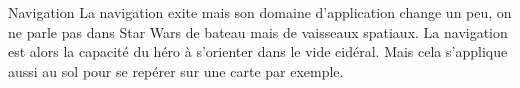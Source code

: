 \begin{paperbox}{Navigation}
    La navigation exite mais son domaine d'application change un peu, on ne parle pas dans Star Wars de bateau mais de vaisseaux spatiaux. La navigation est alors la capacité du héro à s'orienter dans le vide cidéral. Mais cela s'applique aussi au sol pour se repérer sur une carte par exemple.
\end{paperbox}